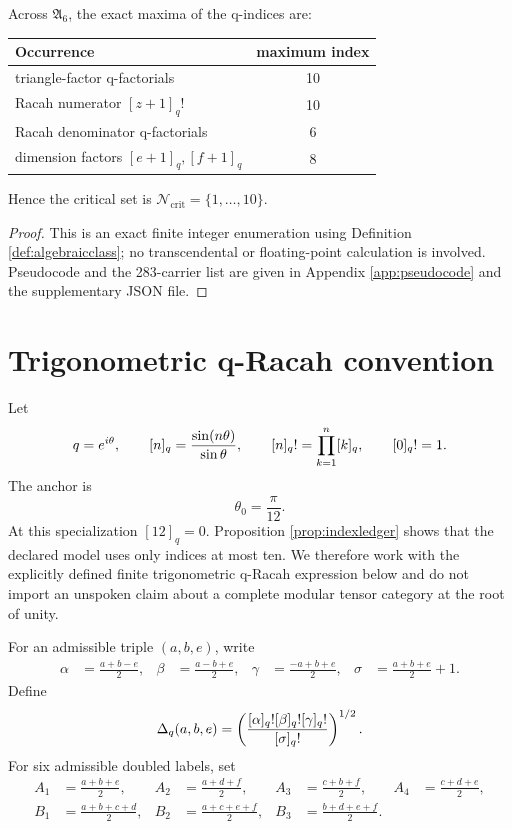 \begin{proposition}
\label{prop:indexledger}
Across $\mathfrak A_6$, the exact maxima of the q-indices are:
\begin{center}
\begin{tabular}{lc}
\toprule
Occurrence & maximum index\\
\midrule
triangle-factor q-factorials & 10\\
Racah numerator $[z+1]_q!$ & 10\\
Racah denominator q-factorials & 6\\
dimension factors $[e+1]_q,[f+1]_q$ & 8\\
\bottomrule
\end{tabular}
\end{center}
Hence the critical set is $\mathcal N_{\mathrm{crit}}=\{1,\ldots,10\}$.
\end{proposition}

\begin{proof}
This is an exact finite integer enumeration using Definition \ref{def:algebraicclass}; no transcendental or floating-point calculation is involved.  Pseudocode and the 283-carrier list are given in Appendix \ref{app:pseudocode} and the supplementary JSON file.
\end{proof}

\section{Trigonometric q-Racah convention}
Let
\begin{equation}
q=e^{i\theta},
\qquad
[n]_q=\frac{\sin(n\theta)}{\sin\theta},
\qquad
[n]_q!=\prod_{k=1}^{n}[k]_q,
\qquad
[0]_q!=1.
\label{eq:qnumber}
\end{equation}
The anchor is
\begin{equation}
\theta_0=\frac{\pi}{12}.
\label{eq:anchor}
\end{equation}
At this specialization $[12]_q=0$.  Proposition \ref{prop:indexledger} shows that the declared model uses only indices at most ten.  We therefore work with the explicitly defined finite trigonometric q-Racah expression below and do not import an unspoken claim about a complete modular tensor category at the root of unity.

For an admissible triple $(a,b,e)$, write
\begin{align}
\alpha&=\frac{a+b-e}{2},&
\beta&=\frac{a-b+e}{2},&
\gamma&=\frac{-a+b+e}{2},&
\sigma&=\frac{a+b+e}{2}+1.
\end{align}
Define
\begin{equation}
\Delta_q(a,b,e)=
\left(
\frac{[\alpha]_q![\beta]_q![\gamma]_q!}
{[\sigma]_q!}
\right)^{1/2}.
\label{eq:qdelta}
\end{equation}
For six admissible doubled labels, set
\begin{align}
A_1&=\frac{a+b+e}{2},& A_2&=\frac{a+d+f}{2},&
A_3&=\frac{c+b+f}{2},& A_4&=\frac{c+d+e}{2},\\
B_1&=\frac{a+b+c+d}{2},&
B_2&=\frac{a+c+e+f}{2},&
B_3&=\frac{b+d+e+f}{2}.
\end{align}

